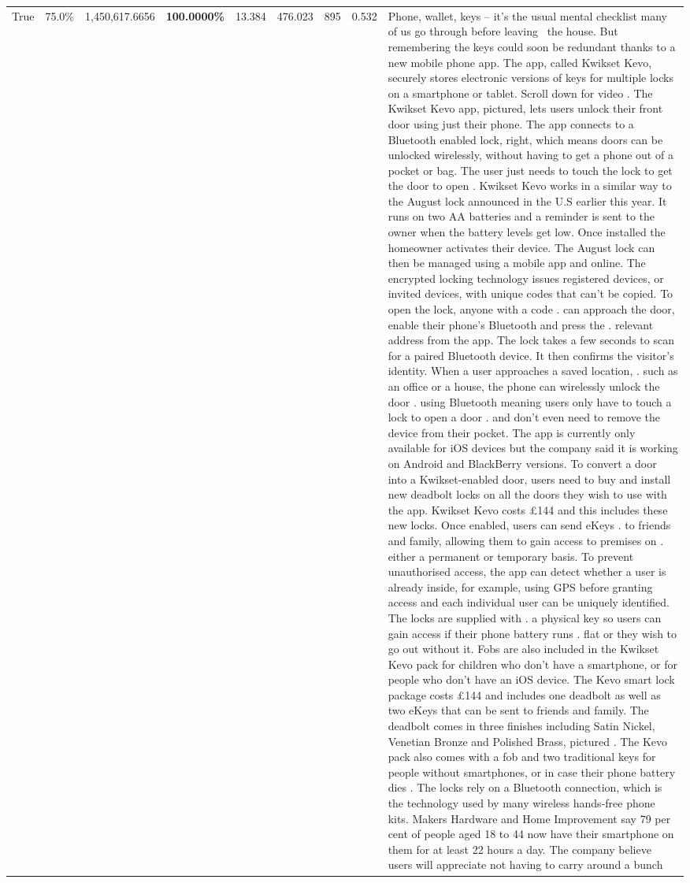 \begin{table}[H]
\begin{tabular}{lllrlllll}
True & 75.0\% & 1,450,617.6656 & \bfseries \color{red} 100.0000\% & 13.384 & 476.023 & 895 & 0.532 & Phone, wallet, keys – it’s the usual mental checklist many of us go through before leaving  the house. But remembering the keys could soon be redundant thanks to a new mobile phone app. The app, called Kwikset Kevo, securely stores electronic versions of keys for multiple locks on a smartphone or tablet. Scroll down for video . The Kwikset Kevo app, pictured, lets users unlock their front door using just their phone. The app connects to a Bluetooth enabled lock, right, which means doors can be unlocked wirelessly, without having to get a phone out of a pocket or bag. The user just needs to touch the lock to get the door to open . Kwikset Kevo works in a similar way to the August lock announced in the U.S earlier this year. It runs on two AA batteries and a reminder is sent to the owner when the battery levels get low. Once installed the homeowner activates their device. The August lock can then be managed using a mobile app and online. The encrypted locking technology issues registered devices, or invited devices, with unique codes that can't be copied. To open the lock, anyone with a code . can approach the door, enable their phone's Bluetooth and press the . relevant address from the app. The lock takes a few seconds to scan for a paired Bluetooth device. It then confirms the visitor's identity. When a user approaches a saved location, . such as an office or a house, the phone can wirelessly unlock the door . using Bluetooth meaning users only have to touch a lock to open a door . and don't even need to remove the device from their pocket. The app is currently only available for iOS devices but the company said it is working on Android and BlackBerry versions. To convert a door into a Kwikset-enabled door, users need to buy and install new deadbolt locks on all the doors they wish to use with the app. Kwikset Kevo costs £144 and this includes these new locks. Once enabled, users can send eKeys . to friends and family, allowing them to gain access to premises on . either a permanent or temporary basis. To prevent unauthorised access, the app can detect whether a user is already inside, for example, using GPS before granting access and each individual user can be uniquely identified. The locks are supplied with . a physical key so users can gain access if their phone battery runs . flat or they wish to go out without it. Fobs are also included in the Kwikset Kevo pack for children who don't have a smartphone, or for people who don't have an iOS device. The Kevo smart lock package costs £144 and includes one deadbolt as well as two eKeys that can be sent to friends and family. The deadbolt comes in three finishes including Satin Nickel, Venetian Bronze and Polished Brass, pictured . The Kevo pack also comes with a fob and two traditional keys for people without smartphones, or in case their phone battery dies . The locks rely on a Bluetooth connection, which is the technology used by many wireless hands-free phone kits. Makers Hardware and Home Improvement say 79 per cent of people aged 18 to 44 now have their smartphone on them for at least 22 hours a day. The company believe users will appreciate not having to carry around a bunch 
\end{tabular}
\end{table}
